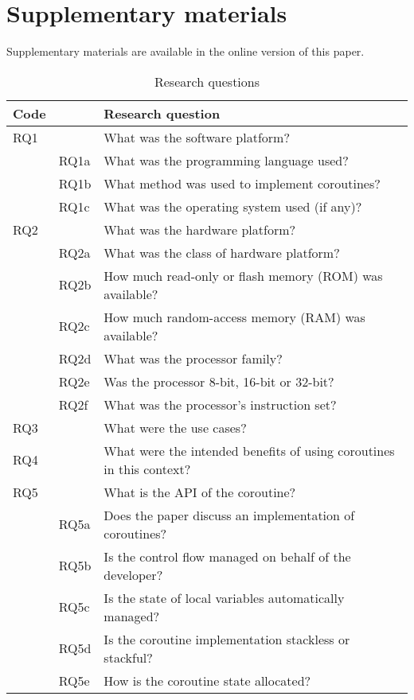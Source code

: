 \appendix

\section{Supplementary materials}
\begin{printonly}
	Supplementary materials are available in the online version of this paper.
\end{printonly}

\begin{screenonly}

\begin{table}[h]
	\caption{Research questions}
	
	\begin{tabular}{l l l}
\hline
Code & & Research question \\
\hline
RQ1	& & What was the software platform?\\
& RQ1a & What was the programming language used?\\
& RQ1b & What method was used to implement coroutines?\\
& RQ1c & What was the operating system used (if any)?\\
RQ2	& & What was the hardware platform?\\
& RQ2a & What was the class of hardware platform?\\
& RQ2b & How much read-only or flash memory (ROM) was available?\\
& RQ2c & How much random-access memory (RAM) was available?\\
& RQ2d & What was the processor family?\\
& RQ2e & Was the processor 8-bit, 16-bit or 32-bit?\\
& RQ2f & What was the processor’s instruction set?\\
RQ3	 &  & What were the use cases?\\
RQ4	 &  & What were the intended benefits of using coroutines in this context?\\
RQ5	 &  & What is the API of the coroutine?\\
& RQ5a & Does the paper discuss an implementation of coroutines?\\
& RQ5b & Is the control flow managed on behalf of the developer?\\
& RQ5c & Is the state of local variables automatically managed?\\
& RQ5d & Is the coroutine implementation stackless or stackful?\\
& RQ5e & How is the coroutine state allocated?\\
\hline
	\end{tabular}
\end{table}
	

\end{screenonly}

